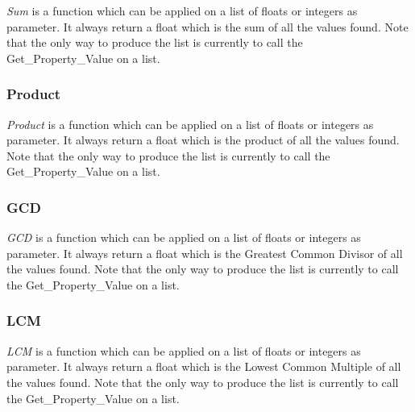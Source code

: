 \textit {Sum} is a function which can be applied on a list of 
floats or integers as parameter. It always return a float which 
is the sum of all the values found. Note that the only way to 
produce the list is currently to call the Get\_Property\_Value 
on a list.

\subsubsection {Product}

\textit {Product} is a function which can be applied on a list 
of floats or integers as parameter. It always return a float 
which is the product of all the values found. Note that the 
only way to produce the list is currently to call the 
Get\_Property\_Value on a list.

\subsubsection {GCD}

\textit {GCD} is a function which can be applied on a list of 
floats or integers as parameter. It always return a float 
which is the Greatest Common Divisor of all the values 
found. Note that the only way to produce the list is 
currently to call the Get\_Property\_Value on a list.

\subsubsection {LCM}

\textit {LCM} is a function which can be applied on a list of 
floats or integers as parameter. It always return a float 
which is the Lowest Common Multiple of all the values 
found. Note that the only way to produce the list is 
currently to call the Get\_Property\_Value on a list.
